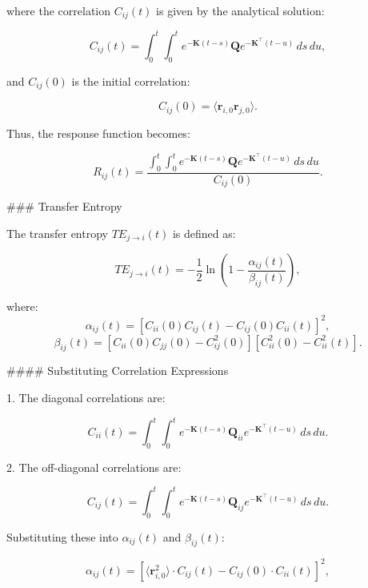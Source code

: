 \documentclass[English, Lau, oneside]{sapthesis}
\begin{document}
\begin{itemize}
where the correlation \(C_{ij}(t)\) is given by the analytical solution:

\begin{equation}
C_{ij}(t) = \int_0^t \int_0^t e^{-\mathbf{K} (t-s)} \mathbf{Q} e^{-\mathbf{K}^\top (t-u)} \, ds \, du,
\end{equation}

and \(C_{ij}(0)\) is the initial correlation:

\begin{equation}
C_{ij}(0) = \langle \mathbf{r}_{i,0} \mathbf{r}_{j,0} \rangle.
\end{equation}

Thus, the response function becomes:

\begin{equation}
R_{ij}(t) = \frac{\int_0^t \int_0^t e^{-\mathbf{K} (t-s)} \mathbf{Q} e^{-\mathbf{K}^\top (t-u)} \, ds \, du}{C_{ij}(0)}.
\end{equation}

### Transfer Entropy

The transfer entropy \(TE_{j \to i}(t)\) is defined as:

\begin{equation}
TE_{j \to i}(t) = -\frac{1}{2} \ln \left(1 - \frac{\alpha_{ij}(t)}{\beta_{ij}(t)}\right),
\end{equation}

where:
\[
\alpha_{ij}(t) = \left[C_{ii}(0)C_{ij}(t) - C_{ij}(0)C_{ii}(t)\right]^2,
\]
\[
\beta_{ij}(t) = \left[C_{ii}(0)C_{jj}(0) - C_{ij}^2(0)\right]\left[C_{ii}^2(0) - C_{ii}^2(t)\right].
\]

#### Substituting Correlation Expressions

1. The diagonal correlations are:

\begin{equation}
C_{ii}(t) = \int_0^t \int_0^t e^{-\mathbf{K} (t-s)} \mathbf{Q}_{ii} e^{-\mathbf{K}^\top (t-u)} \, ds \, du.
\end{equation}

2. The off-diagonal correlations are:

\begin{equation}
C_{ij}(t) = \int_0^t \int_0^t e^{-\mathbf{K} (t-s)} \mathbf{Q}_{ij} e^{-\mathbf{K}^\top (t-u)} \, ds \, du.
\end{equation}

Substituting these into \(\alpha_{ij}(t)\) and \(\beta_{ij}(t)\):

\[
\alpha_{ij}(t) = \left[\langle \mathbf{r}_{i,0}^2 \rangle \cdot C_{ij}(t) - C_{ij}(0) \cdot C_{ii}(t)\right]^2,
\]


\end{itemize}
\end{document}
